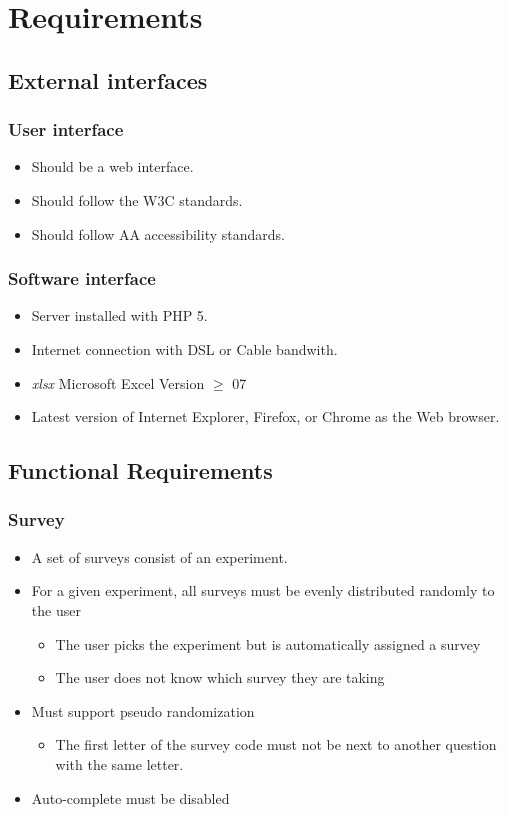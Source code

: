 \documentclass[a4paper,12pt,oneside]{report}
\begin{document}
 \chapter {Requirements}
\section{External interfaces}
\subsection{User interface}
\begin{itemize}
	\item Should be a web interface.
	\item Should follow the W3C standards.
	\item Should follow AA accessibility standards.
\end{itemize}
\subsection{Software interface}
\begin{itemize}
	\item Server installed with PHP 5.
	\item Internet connection with DSL or Cable bandwith.
	\item {\it xlsx} Microsoft Excel Version $\geq$ 07
	\item Latest version of Internet Explorer, Firefox, or Chrome as the Web browser.
\end{itemize}

\section{Functional Requirements}

\subsection {Survey}
\begin{itemize}
	\item A set of surveys consist of an experiment.
	\item For a given experiment, all surveys must be evenly distributed randomly to the user
       	\begin{itemize}   
		\item The user picks the experiment but is automatically assigned a survey
               	\item The user does not know which survey they are taking
	\end{itemize}
        \item Must support pseudo randomization
	\begin{itemize}
                \item The first letter of the survey code must not be next to another question with the same letter.
	\end{itemize}
       	\item Auto-complete must be disabled
\end{itemize}
\end{document}
